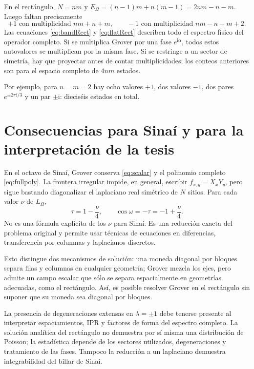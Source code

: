\documentclass[11pt,a4paper]{article}
\newcommand{\ii}{\mathrm i}
\numberwithin{equation}{section}
\begin{document}
En el rectángulo, $N=nm$ y $E_\Omega=(n-1)m+n(m-1)=2nm-n-m$. Luego faltan precisamente
\begin{equation}\label{eq:flatRect}
 \boxed{+1\text{ con multiplicidad }nm+n+m,\qquad
 -1\text{ con multiplicidad }nm-n-m+2.}
\end{equation}
Las ecuaciones \eqref{eq:bandRect} y \eqref{eq:flatRect} describen todo el espectro físico del operador completo. Si se multiplica Grover por una fase $e^{\ii\alpha}$, todos estos autovalores se multiplican por la misma fase. Si se restringe a un sector de simetría, hay que proyectar antes de contar multiplicidades; los conteos anteriores son para el espacio completo de $4nm$ estados.

Por ejemplo, para $n=m=2$ hay ocho valores $+1$, dos valores $-1$, dos pares $e^{\pm2\pi\ii/3}$ y un par $\pm\ii$: dieciséis estados en total.

\section{Consecuencias para Sinaí y para la interpretación de la tesis}
En el octavo de Sinaí, Grover conserva \eqref{eq:scalar} y el polinomio completo \eqref{eq:fullpoly}. La frontera irregular impide, en general, escribir $f_{x,y}=X_xY_y$, pero sigue bastando diagonalizar el laplaciano real simétrico de $N$ sitios. Para cada valor $\nu$ de $L_\Omega$,
\begin{equation}
 \tau=1-\frac\nu4,\qquad
 \cos\omega=-\tau=-1+\frac\nu4.
\end{equation}
No es una fórmula explícita de los $\nu$ para Sinaí. Es una reducción exacta del problema original y permite usar técnicas de ecuaciones en diferencias, transferencia por columnas y laplacianos discretos.

Esto distingue dos mecanismos de solución: una moneda diagonal por bloques separa filas y columnas en cualquier geometría; Grover mezcla los ejes, pero admite un campo escalar que sólo se separa espacialmente en geometrías adecuadas, como el rectángulo. Así, es posible resolver Grover en el rectángulo sin suponer que su moneda sea diagonal por bloques.

La presencia de degeneraciones extensas en $\lambda=\pm1$ debe tenerse presente al interpretar espaciamientos, IPR y factores de forma del espectro completo. La solución analítica del rectángulo no demuestra por sí misma una distribución de Poisson; la estadística depende de los sectores utilizados, degeneraciones y tratamiento de las fases. Tampoco la reducción a un laplaciano demuestra integrabilidad del billar de Sinaí.
\end{document}
